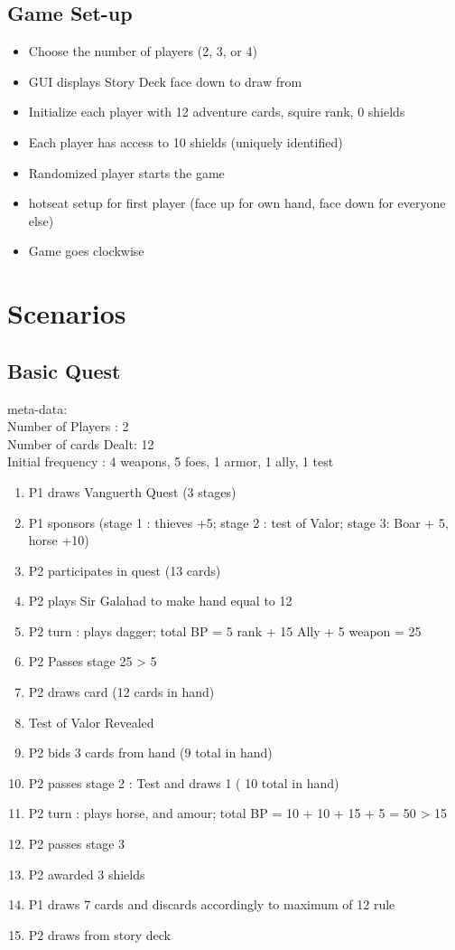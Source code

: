 \documentclass[a4paper,11pt]{article}
\begin{document}
\subsection{Game Set-up}
\begin{itemize}
\item Choose the number of players (2, 3, or 4)
\item GUI displays Story Deck face down to draw from
\item Initialize each player with 12 adventure cards, squire rank, 0 shields
\item Each player has access to 10 shields (uniquely identified) 
\item Randomized player starts the game 
\item hotseat setup for first player (face up for own hand, face down for everyone else)
\item Game goes clockwise
\end{itemize}


\section{Scenarios}

\subsection{Basic Quest}
meta-data:\\
Number of Players : 2\\
Number of cards Dealt: 12\\
Initial frequency : 4 weapons, 5 foes, 1 armor, 1 ally, 1 test\\
\begin{enumerate}
	\item P1 draws Vanguerth Quest (3 stages)
	\item P1 sponsors (stage 1 : thieves +5; stage 2 : test of Valor; stage 3: Boar + 5, horse +10)
	\item P2 participates in quest (13 cards)
	\item P2 plays Sir Galahad to make hand equal to 12
	\item P2 turn : plays dagger; total BP =  5 rank + 15 Ally + 5 weapon = 25
	\item P2 Passes stage 25 > 5
	\item P2 draws card (12 cards in hand)
	\item Test of Valor Revealed 
	\item P2 bids 3 cards from hand (9 total in hand)
	\item P2 passes stage 2 : Test and draws 1 ( 10 total in hand)
	\item P2 turn : plays horse, and amour; total BP = 10 + 10 + 15 + 5 = 50 > 15
	\item P2 passes stage 3
	\item P2 awarded 3 shields
	\item P1 draws 7 cards and discards accordingly to  maximum of 12 rule
	\item P2 draws from story deck
\end{enumerate}
\end{document}
